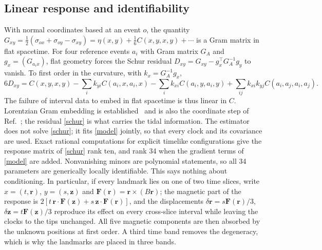 \documentclass[11pt,a4paper]{article}
\begin{document}
\subsection{Linear response and identifiability}
With normal coordinates based at an event $o$, the quantity
$G_{xy}=\tfrac12(\sigma_{ox}+\sigma_{oy}-\sigma_{xy})
=\eta(x,y)+\tfrac16C(x,y,x,y)+\cdots$ is a Gram matrix in flat spacetime.
For four reference events $a_i$ with Gram matrix $G_A$ and
$g_x=(G_{a_ix})$, flat geometry forces the Schur residual
$D_{xy}=G_{xy}-g_x^{\!\top}G_A^{-1}g_y$ to vanish. To first order in the
curvature, with $k_x=G_A^{-1}g_x$,
\begin{equation}
 6D_{xy}=C(x,y,x,y)-\sum_ik_{yi}C(a_i,x,a_i,x)-\sum_ik_{xi}C(a_i,y,a_i,y)
 +\sum_{ij}k_{xi}k_{yj}C(a_i,a_j,a_i,a_j). \label{schur}
\end{equation}
The failure of interval data to embed in flat spacetime is thus linear in
$C$. Lorentzian Gram embedding is established~\cite{clough} and is also the
coordinate step of Ref.~\cite{madsen}; the residual \eqref{schur} is what
carries the tidal information. The estimator does not solve \eqref{schur};
it fits \eqref{model} jointly, so that every clock and its covariance are
used. Exact rational computations for explicit timelike configurations give
the response matrix of \eqref{schur} rank ten, and rank 34 when the gradient
terms of \eqref{model} are added. Nonvanishing minors are polynomial
statements, so all 34 parameters are generically locally identifiable. This
says nothing about conditioning. In particular, if every landmark lies on
one of two time slices, write $x=(t,\mathbf r)$, $y=(s,\mathbf z)$ and
$\mathbf F(\mathbf r)=\mathbf r\times(B\mathbf r)$; the magnetic part of the
response is $2[t\,\mathbf r\!\cdot\!\mathbf F(\mathbf z)
+s\,\mathbf z\!\cdot\!\mathbf F(\mathbf r)]$, and the displacements
$\delta\mathbf r=s\mathbf F(\mathbf r)/3$,
$\delta\mathbf z=t\mathbf F(\mathbf z)/3$ reproduce its effect on every
cross-slice interval while leaving the clocks to the tips unchanged. All
five magnetic components are then absorbed by the unknown positions at first
order. A third time band removes the degeneracy, which is why the landmarks
are placed in three bands.
\end{document}
